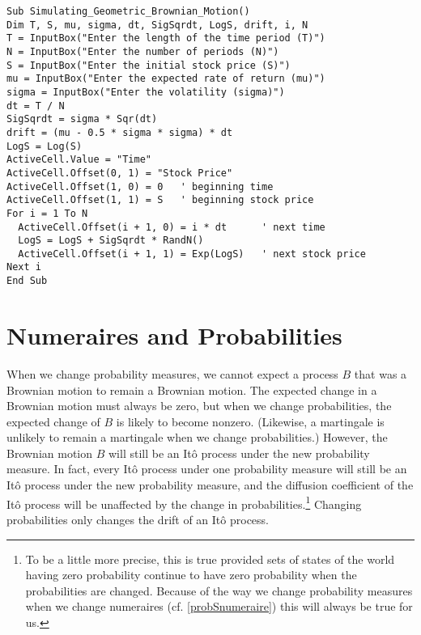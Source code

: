 \small\begin{verbatim}
Sub Simulating_Geometric_Brownian_Motion()
Dim T, S, mu, sigma, dt, SigSqrdt, LogS, drift, i, N
T = InputBox("Enter the length of the time period (T)")
N = InputBox("Enter the number of periods (N)")
S = InputBox("Enter the initial stock price (S)")
mu = InputBox("Enter the expected rate of return (mu)")
sigma = InputBox("Enter the volatility (sigma)")
dt = T / N
SigSqrdt = sigma * Sqr(dt)
drift = (mu - 0.5 * sigma * sigma) * dt
LogS = Log(S)
ActiveCell.Value = "Time"
ActiveCell.Offset(0, 1) = "Stock Price"
ActiveCell.Offset(1, 0) = 0   ' beginning time
ActiveCell.Offset(1, 1) = S   ' beginning stock price
For i = 1 To N
  ActiveCell.Offset(i + 1, 0) = i * dt      ' next time
  LogS = LogS + SigSqrdt * RandN()
  ActiveCell.Offset(i + 1, 1) = Exp(LogS)   ' next stock price
Next i
End Sub
\end{verbatim}\normalsize



\section{Numeraires and Probabilities}\label{s_girsanov}
When we change probability measures, we cannot expect a process $B$ that was a Brownian motion to remain a Brownian motion.    The expected change in a Brownian motion must always be zero, but when we change probabilities, the expected change of $B$ is likely to become nonzero.  (Likewise, a martingale is unlikely to remain a martingale when we change probabilities.)  However, the Brownian motion $B$ will still be an It\^o process under the new probability measure.  In fact, every It\^o process under one probability measure will still be an It\^o process under the new probability measure, and the diffusion coefficient of the It\^o process will be unaffected by the change in probabilities.\footnote{To be a little more precise, this is true provided sets of states of the world having zero probability continue to have zero probability when the probabilities are changed.  Because of the way we change probability measures when we change numeraires (cf.  \eqref{probSnumeraire}) this will always be true for us.}  Changing probabilities only changes the drift of an It\^o process.  

